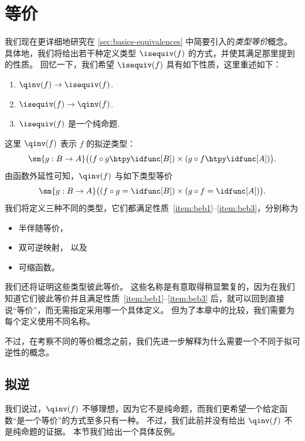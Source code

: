 \chapter{等价}
\label{cha:equivalences}

我们现在更详细地研究在 \cref{sec:basics-equivalences} 中简要引入的\emph{类型等价}概念。
具体地，我们将给出若干种定义类型 $\isequiv(f)$ 的方式，并使其满足那里提到的性质。
回忆一下，我们希望 $\isequiv(f)$ 具有如下性质，这里重述如下：
\begin{enumerate}
\item $\qinv(f) \to \isequiv (f)$.\label{item:beb1}
\item $\isequiv (f) \to \qinv(f)$.\label{item:beb2}
\item $\isequiv(f)$ 是一个纯命题.\label{item:beb3}
\end{enumerate}
这里 $\qinv(f)$ 表示 $f$ 的拟逆类型：
\begin{equation*}
  \sm{g:B\to A} \big((f \circ g \htpy \idfunc[B]) \times (g\circ f \htpy \idfunc[A])\big).
\end{equation*}
由函数外延性可知，$\qinv(f)$ 与如下类型等价
\begin{equation*}
  \sm{g:B\to A} \big((f \circ g = \idfunc[B]) \times (g\circ f = \idfunc[A])\big).
\end{equation*}
我们将定义三种不同的类型，它们都满足性质~\ref{item:beb1}--\ref{item:beb3}，分别称为
\begin{itemize}
\item 半伴随等价，
\item 双可逆映射，
  以及
\item 可缩函数。
\end{itemize}
我们还将证明这些类型彼此等价。
这些名称是有意取得稍显繁复的，因为在我们知道它们彼此等价并且满足性质~\ref{item:beb1}--\ref{item:beb3} 后，就可以回到直接说“等价”，而无需指定采用哪一个具体定义。
但为了本章中的比较，我们需要为每个定义使用不同名称。

不过，在考察不同的等价概念之前，我们先进一步解释为什么需要一个不同于拟可逆性的概念。

\section{拟逆}
\label{sec:quasi-inverses}

%
我们说过，$\qinv(f)$ 不够理想，因为它不是纯命题，而我们更希望一个给定函数“是一个等价”的方式至多只有一种。
不过，我们此前并没有给出 $\qinv(f)$ 不是纯命题的证据。
本节我们给出一个具体反例。

